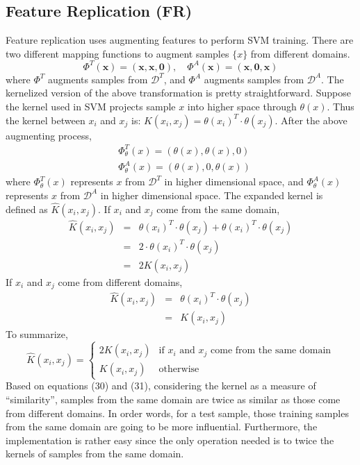 \subsection{Feature Replication (FR)}
Feature replication \cite{daume2007frustratingly} uses augmenting features to perform SVM training. There are two different mapping functions to augment samples $\{x\}$ from different domains. 
\begin{equation}
\Phi^T(\mathbf{x}) = (\mathbf{x},\mathbf{x},\mathbf{0}), \quad  \Phi^A(\mathbf{x}) = (\mathbf{x},\mathbf{0}, \mathbf{x})
\end{equation}
where $\Phi^T$ augments samples from $\mathcal{D}^T$, and $\Phi^A$ augments samples from $\mathcal{D}^A$. The kernelized version of the above transformation is pretty straightforward. Suppose the kernel used in SVM projects sample $x$ into higher space through $\theta(x)$. Thus the kernel between $x_i$ and $x_j$ is: $K(x_i, x_j) = \theta(x_i)^T \cdot \theta(x_j)$. After the above augmenting process, 
\begin{eqnarray}
& \Phi_{\theta}^T(x) = (\theta(x), \theta(x), 0) \nonumber \\
& \Phi_{\theta}^A(x) = (\theta(x), 0, \theta(x)) 
\end{eqnarray}
where $\Phi_{\theta}^T(x)$ represents $x$ from $\mathcal{D}^T$ in higher dimensional space, and $\Phi_{\theta}^A(x)$ represents $x$ from $\mathcal{D}^A$ in higher dimensional space. The expanded kernel is defined as $\hat K(x_i, x_j)$. If $x_i$ and $x_j$ come from the same domain, 
\begin{eqnarray}
\hat K(x_i, x_j) &  = & \theta(x_i)^T \cdot \theta(x_j) + \theta(x_i)^T \cdot \theta(x_j) \nonumber \\
 & = & 2 \cdot \theta(x_i)^T \cdot \theta(x_j)   \nonumber \\
 & = & 2 K(x_i, x_j)
\end{eqnarray}
\noindent If  $x_i$ and $x_j$ come from different domains,
\begin{eqnarray}
\hat K(x_i, x_j)  & = &  \theta(x_i)^T \cdot \theta(x_j)  \nonumber \\
 & = &  K(x_i, x_j) 
\end{eqnarray}
\noindent To summarize,  
\[
 \hat K(x_i, x_j) =
  \begin{cases}
   2 K(x_i, x_j) & \text{if } x_i \text{ and } x_j \text{ come from the same domain}\\
   K(x_i, x_j)   & \text{otherwise} 
  \end{cases}
\]
\noindent Based on equations (30) and (31), considering the kernel as a measure of ``similarity'', samples from the same domain are twice as similar as those come from different domains. In order words, for a test sample, those training samples from the same domain  are going to be more influential. Furthermore, the implementation is rather easy since the only operation needed is to twice the kernels of samples from the same domain. 

